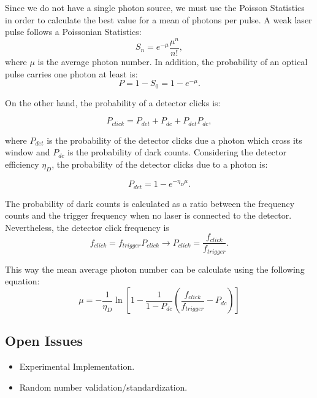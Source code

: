 \begin{refsection}
Since we do not have a single photon source, we must use the Poisson Statistics in order to calculate the best value for a mean of photons per pulse. A weak laser pulse follows a Poissonian Statistics\cite{Fox06}:
\begin{equation}\label{eq:poisson}
  S_n = e^{-\mu}\frac{\mu^{n}}{n!},
\end{equation}
where $\mu$ is the average photon number. In addition, the probability of an optical pulse carries one photon at least is:
\begin{equation}\label{eq:prob1photon}
  P = 1 - S_0 = 1 - e^{-\mu}.
\end{equation}

On the other hand, the probability of a detector clicks is:

\begin{equation}\label{eq:detectorclickprob}
  P_{click} = P_{det}+P_{dc} + P_{det}P_{dc},
\end{equation}

where $P_{det}$ is the probability of the detector clicks due a photon which cross its window and $P_{dc}$ is the probability of dark counts. Considering the detector efficiency $\eta_{D}$, the probability of the detector clicks due to a photon is:

\begin{equation}\label{eq:probclickefficiency}
  P_{det} = 1 - e^{- \eta_{D}\mu}.
\end{equation}

The probability of dark counts is calculated as a ratio between the frequency counts and the trigger frequency when no laser is connected to the detector. Nevertheless, the detector click frequency is
\begin{equation}\label{eq:frequencyclick}
  f_{click} = f_{trigger}P_{click} \longrightarrow P_{click}=\frac{f_{click}}{f_{trigger}}.
\end{equation}

This way the mean average photon number can be calculate using the following equation:
\begin{equation}\label{eq:meanphotonnumber}
  \mu = - \frac{1}{\eta_{D}}\ln\left [1-\frac{1}{1-P_{dc}}\left (\frac{f_{click}}{f_{trigger}}-P_{dc} \right)\right]
\end{equation}

\subsection{Open Issues}
\begin{itemize}
  \item Experimental Implementation.
  \item Random number validation/standardization. 
\end{itemize}
\newpage


\clearpage
\printbibliography[heading=subbibliography]
\end{refsection}
\cleardoublepage
